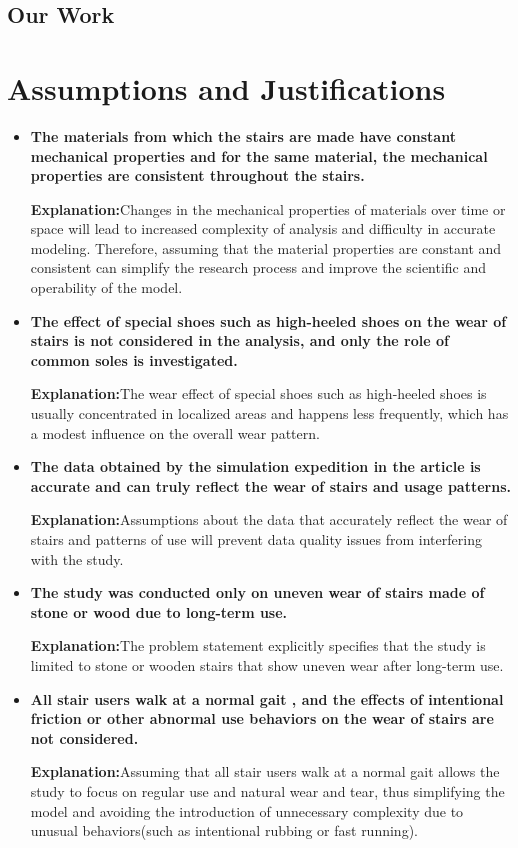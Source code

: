 \documentclass{mcmthesis}
\begin{document}
\subsection{Our Work}
\section{Assumptions and Justifications}
\begin{itemize}
\item \textbf{The materials from which the stairs are made have constant mechanical properties and for the same material, the mechanical properties are consistent throughout the stairs.}

\textbf{Explanation:}Changes in the mechanical properties of materials over time or space will lead to increased complexity of analysis and difficulty in accurate modeling. Therefore, assuming that the material properties are constant and consistent can simplify the research process and improve the scientific and operability of the model.

\item \textbf{The effect of special shoes such as high-heeled shoes on the wear of stairs is not considered in the analysis, and only the role of common soles is investigated.}

\textbf{Explanation:}The wear effect of special shoes such as high-heeled shoes is usually concentrated in localized areas and happens less frequently, which has a modest influence on the overall wear pattern.

\item \textbf{The data obtained by the simulation expedition in the article is accurate and can truly reflect the wear of stairs and usage patterns.}

\textbf{Explanation:}Assumptions about the data that accurately reflect the wear of stairs and patterns of use will prevent data quality issues from interfering with the study.

\item \textbf{The study was conducted only on uneven wear of stairs made of stone or wood due to long-term use.}

\textbf{Explanation:}The problem statement explicitly specifies that the study is limited to stone or wooden stairs that show uneven wear after long-term use.

\item \textbf{All stair users walk at a normal gait , and the effects of intentional friction or other abnormal use behaviors on the wear of stairs are not considered.}

\textbf{Explanation:}Assuming that all stair users walk at a normal gait allows the study to focus on regular use and natural wear and tear, thus simplifying the model and avoiding the introduction of unnecessary complexity due to unusual behaviors(such as intentional rubbing or fast running).

\end{itemize}
\end{document}
